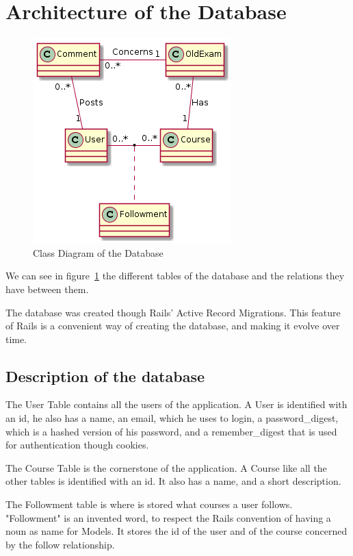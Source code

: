 \documentclass[12pt,a4paper]{article}
\begin{document}
\section{Architecture of the Database}

\begin{figure}[h]
	\centering
	\includegraphics[scale=0.7]{src/digram.png}
	\caption{\label{fig:uml} Class Diagram of the Database}
\end{figure}

We can see in figure~\ref{fig:uml} the different tables of the database and the
relations they have between them.

The database was created though Rails' Active Record Migrations. This feature of
Rails is a convenient way of creating the database, and making it evolve
over time.


\subsection{Description of the database}

The User Table contains all the users of the application. A User is identified
with an id, he also has a name, an email, which he uses to login, a
password\_digest, which is a hashed version of his password, and a
remember\_digest that is used for authentication though cookies.

The Course Table is the cornerstone of the application. A Course like all the
other tables is identified with an id. It also has a name, and a short
description.

The Followment table is where is stored what courses a user follows.
"Followment" is an invented word, to respect the Rails convention of having a
noun as name for Models. It stores the id of the user and of the course
concerned by the follow relationship.
\end{document}
